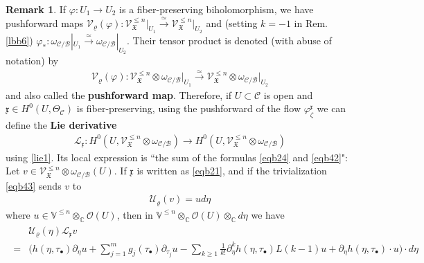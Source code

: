 \documentclass[11pt,b5paper,notitlepage]{article}
\theoremstyle{definition}
\newtheorem{rem}[df]{Remark}
\theoremstyle{plain}
\newcommand{\fk}{\mathfrak}
\newcommand{\mc}{\mathcal}
\newcommand{\SV}{\mathscr{V}}
\newcommand{\xk}{\mathfrak x}
\newcommand{\blt}{\bullet}
\newcommand{\Vbb}{\mathbb V}
\newcommand{\Cbb}{\mathbb C}
\newcommand{\<}{\left\langle}
\renewcommand{\>}{\right\rangle}
\newcommand{\MC}{\mathcal{C}}
\newcommand{\fx}{\mathfrak{X}}
\numberwithin{equation}{section}
\begin{document}
\begin{rem}\label{lbb7}
If $\varphi:U_1\rightarrow U_2$ is a fiber-preserving biholomorphism, we have pushforward maps $\mc V_\varrho(\varphi):\SV_\fx^{\leq n}\vert_{U_1} \xrightarrow{\simeq} \SV_\fx^{\leq n}\vert_{U_2}$ and (setting $k=-1$ in Rem. \ref{lbb6}) $\varphi_*:\omega_{\mc C/\mc B}|_{U_1}\xrightarrow{\simeq}\omega_{\mc C/\mc B}|_{U_2}$. Their tensor product is denoted (with abuse of notation) by
\begin{align}
\mc V_\varrho(\varphi):\SV_\fx^{\leq n}\otimes\omega_{\mc C/\mc B}\vert_{U_1} \xrightarrow{\simeq} \SV_\fx^{\leq n}\otimes\omega_{\mc C/\mc B}\vert_{U_2}
\end{align}
and also called the \textbf{pushforward map}. Therefore, if $U\subset \mc C$ is open and $\xk\in H^0(U,\Theta_\MC)$ is fiber-preserving, using the pushforward of the flow $\varphi^\xk_\zeta$ we can define the \textbf{Lie derivative} 
\begin{align}
\mc L_\xk:H^0(U,\SV_{\fk X}^{\leq n}\otimes\omega_{\mc C/\mc B})\rightarrow H^0(U,\SV_{\fk X}^{\leq n}\otimes\omega_{\mc C/\mc B})
\end{align}
using \eqref{lie1}. Its local expression is ``the sum of the formulas \eqref{eqb24} and \eqref{eqb42}": Let $v\in\SV_{\fk X}^{\leq n}\otimes\omega_{\mc C/\mc B}(U)$. If $\xk$ is written as \eqref{eqb21}, and if the trivialization \eqref{eqb43} sends $v$ to
\begin{align*}
\mc U_\varrho(v)=ud\eta
\end{align*}
where $u\in \Vbb^{\leq n}\otimes_\Cbb\mc O(U)$, then in $\Vbb^{\leq n}\otimes_\Cbb\mc O(U)\otimes_\Cbb d\eta$ we have
\begin{align}\label{eqb44}
\begin{aligned}
&\mc U_\varrho(\eta)\mc L_\xk v\\
=&\Big(h(\eta,\tau_\blt)\partial_\eta u+\sum_{j=1}^m g_j(\tau_\blt)\partial_{\tau_j}u-\sum_{k\geq 1}\frac{1}{k!}\partial_\eta^k h(\eta,\tau_\blt)L(k-1)u+\partial_\eta h(\eta,\tau_\blt)\cdot u\Big)\cdot d\eta
\end{aligned}
\end{align}
\end{rem}
\end{document}
